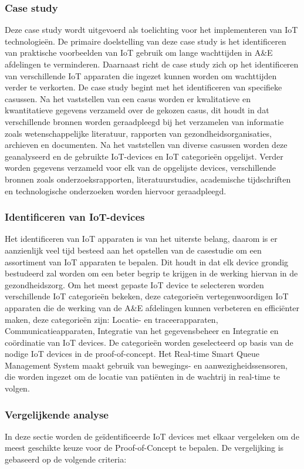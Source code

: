 \subsubsection*{Case study}
Deze case study wordt uitgevoerd als toelichting voor het implementeren van IoT technologieën. De primaire doelstelling van deze case study is het identificeren van praktische voorbeelden van IoT gebruik om lange wachttijden in A\&E afdelingen te verminderen. Daarnaast richt de case study zich op het identificeren van verschillende IoT apparaten die ingezet kunnen worden om wachttijden verder te verkorten. De case study begint met het identificeren van specifieke casussen. Na het vaststellen van een casus worden er kwalitatieve en kwantitatieve gegevens verzameld over de gekozen casus, dit houdt in dat verschillende bronnen worden geraadpleegd bij het verzamelen van informatie zoals wetenschappelijke literatuur, rapporten van gezondheidsorganisaties, archieven en documenten. Na het vaststellen van diverse casussen worden deze geanalyseerd en de gebruikte IoT-devices en IoT categorieën opgelijst. Verder worden gegevens verzameld voor elk van de opgelijste devices, verschillende bronnen zoals onderzoeksrapporten, literatuurstudies, academische tijdschriften en technologische onderzoeken worden hiervoor geraadpleegd. 

\subsubsection*{Identificeren van IoT-devices}
Het identificeren van IoT apparaten is van het uiterste belang, daarom is er aanzienlijk veel tijd besteed aan het opstellen van de casestudie om een assortiment van IoT apparaten te bepalen. Dit houdt in dat elk device grondig bestudeerd zal worden om een beter begrip te krijgen in de werking hiervan in de gezondheidszorg. Om het meest gepaste IoT device te selecteren worden verschillende IoT categorieën bekeken, deze categorieën vertegenwoordigen IoT apparaten die de werking van de A\&E afdelingen kunnen verbeteren en efficiënter maken, deze categorieën zijn: Locatie- en traceerapparaten, Communicatieapparaten, Integratie van het gegevensbeheer en Integratie en coördinatie van IoT devices. De categorieën worden geselecteerd op basis van de nodige IoT devices in de proof-of-concept. Het Real-time Smart Queue Management System maakt gebruik van bewegings- en aanwezigheidssensoren, die worden ingezet om de locatie van patiënten in de wachtrij in real-time te volgen.

\subsubsection*{Vergelijkende analyse}
In deze sectie worden de geïdentificeerde IoT devices met elkaar vergeleken om de meest geschikte keuze voor de Proof-of-Concept te bepalen. De vergelijking is gebaseerd op de volgende criteria:

